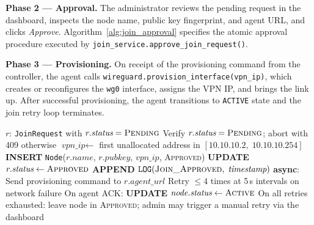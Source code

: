 \documentclass[conference]{IEEEtran}
\begin{document}
\textbf{Phase 2 — Approval.} The administrator reviews the pending request in the
dashboard, inspects the node name, public key fingerprint, and agent URL, and
clicks \emph{Approve}. Algorithm~\ref{alg:join_approval} specifies the atomic
approval procedure executed by \texttt{join\_service.approve\_join\_request()}.

\textbf{Phase 3 — Provisioning.} On receipt of the provisioning command from the
controller, the agent calls \texttt{wireguard.provision\_interface(vpn\_ip)}, which
creates or reconfigures the \texttt{wg0} interface, assigns the VPN IP, and brings
the link up. After successful provisioning, the agent transitions to \texttt{ACTIVE}
state and the join retry loop terminates.

\begin{algorithm}[!t]
\caption{Join Approval Procedure}
\label{alg:join_approval}
\begin{algorithmic}[1]
\REQUIRE $r$: \texttt{JoinRequest} with $r.\textit{status} = \textsc{Pending}$
\STATE Verify $r.\textit{status} = \textsc{Pending}$; abort with 409 otherwise
\STATE $\textit{vpn\_ip} \leftarrow$ first unallocated address in $[10.10.10.2,\;10.10.10.254]$
\STATE \textbf{INSERT} \texttt{Node}($r.\textit{name}$, $r.\textit{pubkey}$,
       $\textit{vpn\_ip}$, \textsc{Approved})
\STATE \textbf{UPDATE} $r.\textit{status} \leftarrow \textsc{Approved}$
\STATE \textbf{APPEND} $\texttt{LOG}(\textsc{Join\_Approved},\;\textit{timestamp})$
\STATE \textbf{async}: Send provisioning command to $r.\textit{agent\_url}$
\STATE \quad Retry $\leq 4$ times at 5\,s intervals on network failure
\STATE \quad On agent ACK: \textbf{UPDATE} $\textit{node.status} \leftarrow \textsc{Active}$
\STATE \quad On all retries exhausted: leave node in \textsc{Approved};
       admin may trigger a manual retry via the dashboard
\end{algorithmic}
\end{algorithm}
\end{document}
